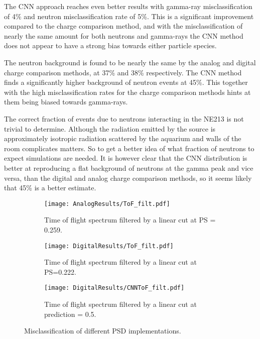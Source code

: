 \documentclass[main.tex]{subfiles}
\begin{document}
The CNN approach reaches even better results with gamma-ray misclassification of 4\% and neutron misclassification rate of 5\%.
This is a significant improvement compared to the charge comparison method, and with the misclassification of nearly the same amount for both neutrons and gamma-rays the CNN method does not appear to have a strong bias towards either particle species.

The neutron background is found to be nearly the same by the analog and digital charge comparison methods, at 37\% and 38\% respectively. The CNN method finds a significantly higher background of neutron events at 45\%. This together with the high misclassification rates for the charge comparison methods hints at them being biased towards gamma-rays.

The correct fraction of events due to neutrons interacting in the NE213 is not trivial to determine. Although the radiation emitted by the source is approximately isotropic radiation scattered by the aquarium and walls of the room complicates matters. So to get a better idea of what fraction of neutrons to expect simulations are needed. It is however clear that the CNN distribution is better at reproducing a flat background of neutrons at the gamma peak and vice versa, than the digital and analog charge comparison methods, so it seems likely that 45\% is a better estimate.



\begin{figure}
    \centering
    \begin{subfigure}[bh]{\textwidth}
   	   	\centering
	    \texttt{[image: AnalogResults/ToF\_filt.pdf]}
    	\caption{Time of flight spectrum filtered by a linear cut at PS = 0.259.}
    	\label{fig:ToF_filt_A}
   	\end{subfigure}
    \begin{subfigure}[bh]{\textwidth}
   	    \centering
        \texttt{[image: DigitalResults/ToF\_filt.pdf]}
        \caption{Time of flight spectrum filtered by a linear cut at PS=0.222.}
        \label{fig:ToF_filt_D}
    \end{subfigure}
	\begin{subfigure}[bh]{\textwidth}
	    \centering
        \texttt{[image: DigitalResults/CNNToF\_filt.pdf]}
        \caption{Time of flight spectrum filtered by a linear cut at prediction = 0.5.}
        \label{fig:ToF_filt_D_CNN}
    \end{subfigure}
	\caption[Misclassification of different PSD implementations.]{Misclassification of different PSD implementations.}
    \label{fig:tof_cc_cnn}
\end{figure}
\end{document}
